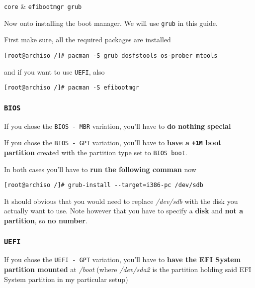 \documentclass[10pt]{dustdoc}
\begin{document}
\begin{packagetable}
    \texttt{core} & \texttt{efibootmgr grub} \\
\end{packagetable}

Now onto installing the boot manager.
We will use \texttt{grub} in this guide.

First make sure, all the required packages are installed

\begin{verbatim}
[root@archiso /]# pacman -S grub dosfstools os-prober mtools
\end{verbatim}

\noindent
and if you want to use \texttt{UEFI}, also

\begin{verbatim}
[root@archiso /]# pacman -S efibootmgr
\end{verbatim}

\subsubsection{\texttt{BIOS}}
\label{sec:bios}

If you chose the \texttt{BIOS - MBR} variation, you’ll have to \textbf{do nothing special}

If you chose the \texttt{BIOS - GPT} variation, you’ll have to \textbf{have a \texttt{+1M} boot partition} created with the partition type set to \texttt{BIOS boot}.

In both cases you’ll have to \textbf{run the following comman} now

\begin{verbatim}
[root@archiso /]# grub-install --target=i386-pc /dev/sdb
\end{verbatim}

\begin{NOTE}
    It should obvious that you would need to replace \textit{/dev/sdb} with the disk you actually want to use.
    Note however that you have to specify a \textbf{disk} and \textbf{not a partition}, so \textbf{no number}.
\end{NOTE}

\subsubsection{\texttt{UEFI}}
\label{sec:uefi}

If you chose the \texttt{UEFI - GPT} variation, you’ll have to \textbf{have the EFI System partition mounted} at \textit{/boot} (where \textit{/dev/sda2} is the partition holding said EFI System partition in my particular setup)
\end{document}
